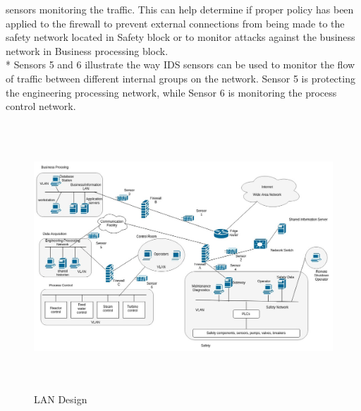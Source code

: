 \documentclass{article}
\begin{document}
sensors monitoring the traffic. This can help determine if
proper policy has been applied to the firewall to prevent external connections from being made
to the safety network located in Safety block or to monitor attacks against the business network in
Business processing block. \\* Sensors 5 and 6 illustrate the way IDS sensors can be used to monitor the flow of traffic
between different internal groups on the network. Sensor 5 is protecting the engineering
processing network, while Sensor 6 is monitoring the process control network.
\begin{figure}[!ht]
	\centering
	\includegraphics[width=12cm,height=10cm]{lan.jpg}
	\caption{LAN Design}
\end{figure}
\end{document}
